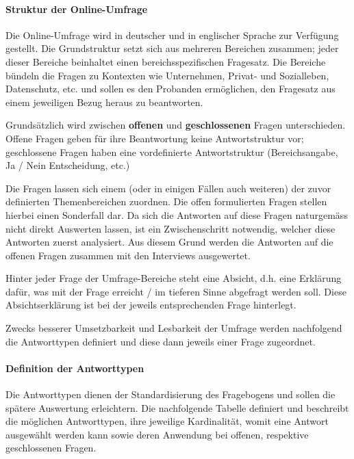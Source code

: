 \documentclass[../../main.tex]{subfiles}
\begin{document}
\paragraph*{Struktur der Online-Umfrage}\mbox{}

\begin{sloppypar}
Die Online-Umfrage wird in deutscher und in englischer Sprache zur Verfügung gestellt. Die Grundstruktur setzt sich aus mehreren Bereichen zusammen; jeder dieser Bereiche beinhaltet einen bereichsspezifischen Fragesatz. Die Bereiche bündeln die Fragen zu Kontexten wie Unternehmen, Privat- und Sozialleben, Datenschutz, etc. und sollen es den Probanden ermöglichen, den Fragesatz aus einem jeweiligen Bezug heraus zu beantworten.

Grundsätzlich wird zwischen \textbf{offenen} und \textbf{geschlossenen} Fragen unterschieden. Offene Fragen geben für ihre Beantwortung keine Antwortstruktur vor; geschlossene Fragen haben eine vordefinierte Antwortstruktur (Bereichsangabe, Ja / Nein Entscheidung, etc.)

Die Fragen lassen sich einem (oder in einigen Fällen auch weiteren) der zuvor definierten Themenbereichen zuordnen. Die offen formulierten Fragen stellen hierbei einen Sonderfall dar. Da sich die Antworten auf diese Fragen naturgemäss nicht direkt Auswerten lassen, ist ein Zwischenschritt notwendig, welcher diese Antworten zuerst analysiert. Aus diesem Grund werden die Antworten auf die offenen Fragen zusammen mit den Interviews ausgewertet.\footnotemark
 
Hinter jeder Frage der Umfrage-Bereiche steht eine Absicht, d.h. eine Erklärung dafür, was mit der Frage erreicht / im tieferen Sinne abgefragt werden soll. Diese Absichtserklärung ist bei der jeweils entsprechenden Frage hinterlegt. 

Zwecks besserer Umsetzbarkeit und Lesbarkeit der Umfrage werden nachfolgend die Antworttypen definiert und diese dann jeweils einer Frage zugeordnet.
\end{sloppypar}


\paragraph*{Definition der Antworttypen}\mbox{}

\begin{sloppypar}
Die Antworttypen dienen der Standardisierung des Fragebogens und sollen die spätere Auswertung erleichtern. Die nachfolgende Tabelle definiert und beschreibt die möglichen Antworttypen, ihre jeweilige Kardinalität, womit eine Antwort ausgewählt werden kann sowie deren Anwendung bei offenen, respektive geschlossenen Fragen. 
\end{sloppypar}
\end{document}
